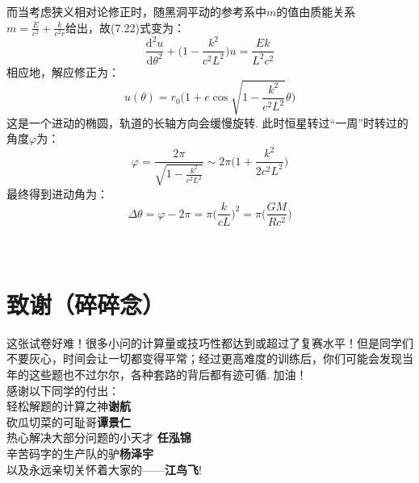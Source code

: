 \documentclass{ctexart}
\begin{document}
而当考虑狭义相对论修正时，随黑洞平动的参考系中$m$的值由质能关系$m=\displaystyle\frac{E}{c^2}+\frac{k}{c^2r}$给出，故(7.22)式变为：
\begin{equation}
\displaystyle \frac{\text{d}^2u}{\text{d}\theta^2}+\Big(1-\frac{k^2}{c^2L^2}\Big)u=\frac{Ek}{L^2c^2} \tag{7.25}
\end{equation}
相应地，解应修正为：
\begin{equation}
u(\theta)=r_0\Big(1+e\cos\sqrt{1-\frac{k^2}{c^2L^2}}\theta\Big) \tag{7.26}
\end{equation}
这是一个进动的椭圆，轨道的长轴方向会缓慢旋转. 此时恒星转过“一周”时转过的角度$\varphi$为：
\begin{equation}
\varphi=\displaystyle\frac{2\pi}{\sqrt{1-\frac{k^2}{c^2L^2}}}\sim 2\pi \Big(1+\frac{k^2}{2c^2L^2}\Big)
 \tag{7.27}
\end{equation}
最终得到进动角为：
\begin{equation}
\Delta{\theta}=\varphi-2\pi=\pi\Big(\frac{k}{cL}\Big)^2=\pi\Big(\frac{GM}{Rc^2}\Big)
 \tag{7.28}
\end{equation}
\\
\\

\section*{致谢（碎碎念）}
这张试卷好难！很多小问的计算量或技巧性都达到或超过了复赛水平！但是同学们不要灰心，时间会让一切都变得平常；经过更高难度的训练后，你们可能会发现当年的这些题也不过尔尔，各种套路的背后都有迹可循. 加油！\\

\noindent 感谢以下同学的付出：\\

\noindent 轻松解题的计算之神\quad \textbf{谢航}\\
砍瓜切菜的可耻哥\quad \textbf{谭景仁}\\
热心解决大部分问题的小天才 \quad \textbf{任泓锦}\\
辛苦码字的生产队的驴\quad \textbf{杨泽宇}\\
以及永远亲切关怀着大家的——\textbf{江鸟飞}!
\end{document}
